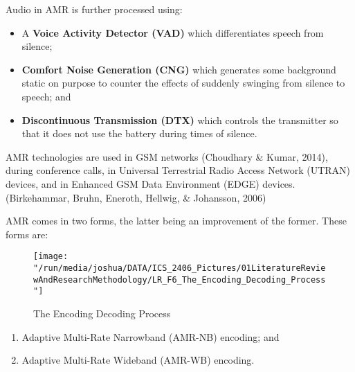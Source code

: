 \documentclass[12pt,svgnames,smaller]{article} %
\begin{document}
	Audio in AMR is further processed using:
	
	\begin{itemize}
		\item A \textbf{Voice Activity Detector (VAD)} which differentiates speech from silence;
		\item \textbf{Comfort Noise Generation (CNG)} which generates some background static on purpose to counter the effects of suddenly swinging from silence to speech; and
		\item \textbf{Discontinuous Transmission (DTX)} which controls the transmitter so that it does not use the battery during times of silence.
	\end{itemize}
	
	AMR technologies are used in GSM networks (Choudhary \& Kumar, 2014), during conference calls, in Universal Terrestrial Radio Access Network (UTRAN) devices, and in Enhanced GSM Data Environment (EDGE) devices. (Birkehammar, Bruhn, Eneroth, Hellwig, \& Johansson, 2006)
	
	AMR comes in two forms, the latter being an improvement of the former. These forms are:
	
	\begin{figure}
		\centering
		\texttt{[image: "/run/media/joshua/DATA/ICS\_2406\_Pictures/01LiteratureReviewAndResearchMethodology/LR\_F6\_The\_Encoding\_Decoding\_Process"]}
		\caption{The Encoding Decoding Process}
		\label{fig:LiteratureReview-Figure6}
	\end{figure}
	
	\begin{enumerate}
		\item Adaptive Multi-Rate Narrowband (AMR-NB) encoding; and 
		\item Adaptive Multi-Rate Wideband (AMR-WB) encoding.
	\end{enumerate}
	
\end{document}

